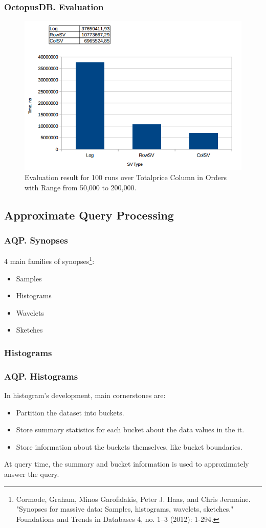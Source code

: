 \documentclass{beamer}
\begin{document}
\begin{frame}
\frametitle{OctopusDB. Evaluation}
\begin{figure}
  \centering
  \includegraphics[scale=0.5]{img/Blinktopus-Evaluations.png}
  \caption{Evaluation result for 100 runs over Totalprice Column in Orders with Range from 50,000 to 200,000.}
\end{figure}
\end{frame}

\subsection{Approximate Query Processing}
\begin{frame}
\frametitle{AQP. Synopses}
4 main families of synopses\footnote{\tiny Cormode, Graham, Minos Garofalakis, Peter J. Haas, and Chris Jermaine. "Synopses for massive data:
Samples, histograms, wavelets, sketches." Foundations and Trends in Databases 4, no. 1–3 (2012): 1-294.}:
\begin{itemize}
\vspace{0.3 cm}
\item{Samples}
\item{Histograms \checkmark}
\item{Wavelets}
\item{Sketches \checkmark}
\end{itemize}
\end{frame}
\subsubsection{Histograms}
\begin{frame}
\frametitle{AQP. Histograms}
	In histogram's development, main cornerstones are:
	\begin{itemize}
		\item {Partition the dataset into buckets.}
		\item {Store summary statistics for each bucket about the data values in the it.}
		\item {Store information about the buckets themselves, like bucket boundaries.}
	\end{itemize}
	At query time, the summary and bucket information is used to approximately answer the query.
\end{frame}
\end{document}
